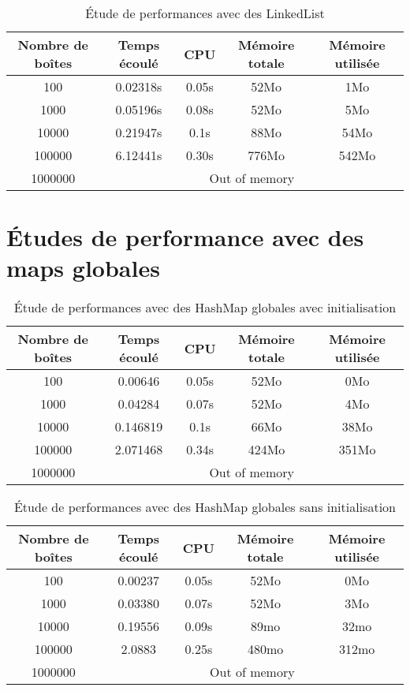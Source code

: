 \begin{table}[htbp]
  \centering
\begin{tabular}{|c|c|c|c|c|}
\hline
Nombre de boîtes & Temps écoulé & CPU & Mémoire totale & Mémoire utilisée\\
\hline
100 & 0.02318s & 0.05s & 52Mo & 1Mo\\
\hline
1000 & 0.05196s & 0.08s & 52Mo & 5Mo\\
\hline
10000 & 0.21947s & 0.1s & 88Mo & 54Mo\\
\hline
100000 & 6.12441s & 0.30s & 776Mo & 542Mo\\
\hline
1000000 & \multicolumn{4}{|c|}{Out of memory}\\
\hline
\end{tabular}
\caption{Étude de performances avec des LinkedList}
\label{tab:linkedlist}
\end{table}
\clearpage
\section{Études de performance avec des maps globales}
\begin{table}[h]
  \centering
\begin{tabular}{|c|c|c|c|c|}
\hline
Nombre de boîtes & Temps écoulé & CPU & Mémoire totale & Mémoire utilisée\\
\hline
100 & 0.00646& 0.05s & 52Mo & 0Mo\\
\hline
1000 & 0.04284 & 0.07s & 52Mo & 4Mo\\
\hline
10000 & 0.146819 & 0.1s & 66Mo & 38Mo\\
\hline
100000 &2.071468 & 0.34s & 424Mo & 351Mo\\
\hline
1000000 & \multicolumn{4}{|c|}{Out of memory}\\
\hline
\end{tabular}
\caption{Étude de performances avec des HashMap globales avec initialisation} 
\label{tab:hashmapglobal}
\end{table}


\begin{table}[h]
  \centering
\begin{tabular}{|c|c|c|c|c|}
\hline
Nombre de boîtes & Temps écoulé & CPU & Mémoire totale & Mémoire utilisée\\
\hline
100 & 0.00237& 0.05s & 52Mo & 0Mo\\
\hline
1000 & 0.03380 & 0.07s & 52Mo & 3Mo\\
\hline
10000 & 0.19556 & 0.09s & 89mo & 32mo\\
\hline
100000 & 2.0883 & 0.25s & 480mo & 312mo\\
\hline
1000000 & \multicolumn{4}{|c|}{Out of memory}\\
\hline
\end{tabular}
\caption{Étude de performances avec des HashMap globales sans initialisation}
\label{tab:hashmapglobalInit}
\end{table}









